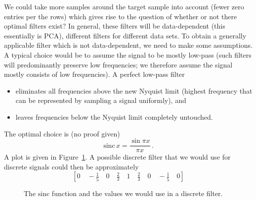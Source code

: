 We could take more samples around the target sample into account (fewer zero
entries per the rows) which gives rise to the question of whether or not there
optimal filters exist? In general, these filters will be data-dependent (this
essentially is PCA), \ie different filters for different data sets. To obtain a
generally applicable filter which is not data-dependent, we need to make some
assumptions. A typical choice would be to assume the signal to be mostly
low-pass (such filters will predominantly preserve low frequencies; we therefore
assume the signal mostly consists of low frequencies). A perfect low-pass filter
\begin{itemize}
\item eliminates all frequencies above the new Nyquist limit (highest frequency
  that can be represented by sampling a signal uniformly), and
\item leaves frequencies below the Nyquist limit completely untouched.
\end{itemize}
The optimal choice is (no proof given)
\begin{equation*}
  \text{sinc}\,x = \frac{\sin \pi x}{\pi x}\,.
\end{equation*}
A plot is given in Figure~\ref{fig:sinc}. A possible discrete filter that we
would use for discrete signals could then be approximately
\begin{equation*}
  \left[ 0 \quad -\tfrac{1}{5} \quad 0 \quad \tfrac{2}{3} \quad 1 \quad \tfrac{2}{3} \quad 0 \quad -\tfrac{1}{5} \quad 0 \right]
\end{equation*}

\begin{figure}[h!]
\centering
{}%
\caption{The $\text{sinc}$ function and the values we would use in a discrete
    filter.}%
\label{fig:sinc}%
\end{figure}
  
